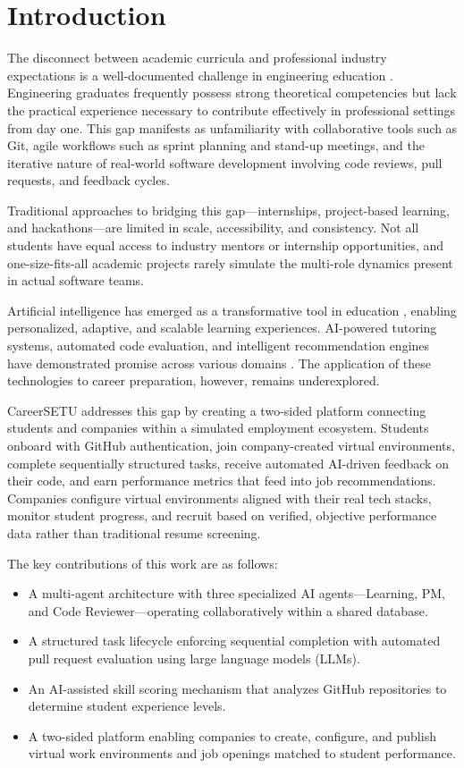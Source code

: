 \documentclass[runningheads]{llncs}
\begin{document}
\section{Introduction}

The disconnect between academic curricula and professional industry expectations is a well-documented challenge in engineering education \cite{b1}. Engineering graduates frequently possess strong theoretical competencies but lack the practical experience necessary to contribute effectively in professional settings from day one. This gap manifests as unfamiliarity with collaborative tools such as Git, agile workflows such as sprint planning and stand-up meetings, and the iterative nature of real-world software development involving code reviews, pull requests, and feedback cycles.

Traditional approaches to bridging this gap---internships, project-based learning, and hackathons---are limited in scale, accessibility, and consistency. Not all students have equal access to industry mentors or internship opportunities, and one-size-fits-all academic projects rarely simulate the multi-role dynamics present in actual software teams.

Artificial intelligence has emerged as a transformative tool in education \cite{b2}, enabling personalized, adaptive, and scalable learning experiences. AI-powered tutoring systems, automated code evaluation, and intelligent recommendation engines have demonstrated promise across various domains \cite{b3}. The application of these technologies to career preparation, however, remains underexplored.

CareerSETU addresses this gap by creating a two-sided platform connecting students and companies within a simulated employment ecosystem. Students onboard with GitHub authentication, join company-created virtual environments, complete sequentially structured tasks, receive automated AI-driven feedback on their code, and earn performance metrics that feed into job recommendations. Companies configure virtual environments aligned with their real tech stacks, monitor student progress, and recruit based on verified, objective performance data rather than traditional resume screening.

The key contributions of this work are as follows:
\begin{itemize}
    \item A multi-agent architecture with three specialized AI agents---Learning, PM, and Code Reviewer---operating collaboratively within a shared database.
    \item A structured task lifecycle enforcing sequential completion with automated pull request evaluation using large language models (LLMs).
    \item An AI-assisted skill scoring mechanism that analyzes GitHub repositories to determine student experience levels.
    \item A two-sided platform enabling companies to create, configure, and publish virtual work environments and job openings matched to student performance.
\end{itemize}
\end{document}
